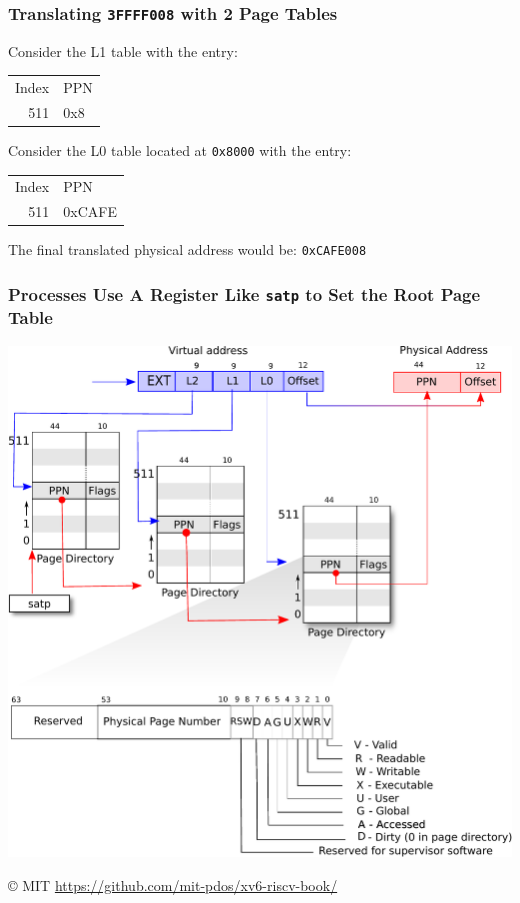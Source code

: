   \begin{frame}
    \frametitle{Translating \texttt{3FFFF008} with 2 Page Tables}

    Consider the L1 table with the entry:

    \begin{center}
    {\ttfamily
    \begin{tabular}{rl}
      Index & PPN \\
      511   & 0x8 \\
    \end{tabular}}
    \end{center}
      
    Consider the L0 table located at \texttt{0x8000} with the entry:

    \begin{center}
    {\ttfamily
    \begin{tabular}{rl}
      Index & PPN \\
      511   & 0xCAFE \\
    \end{tabular}}
    \end{center}
    
    The final translated physical address would be: \texttt{0xCAFE008}
  \end{frame}

  \begin{frame}
    \frametitle{Processes Use A Register Like \texttt{satp} to Set the Root Page Table}

    \begin{center}
      \includegraphics[scale=0.5, clip, trim=0cm 8cm 0cm 0cm]{../lecture-19/riscv_pagetable.pdf}
    \end{center}

    © MIT \url{https://github.com/mit-pdos/xv6-riscv-book/}
  \end{frame}

